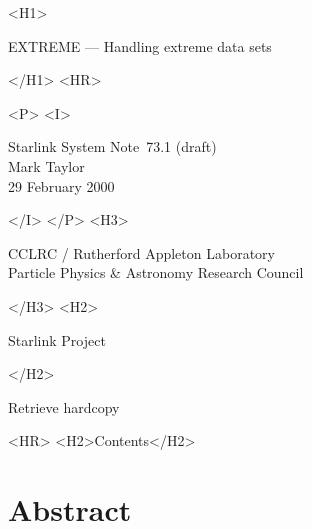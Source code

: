 \documentclass[twoside,11pt]{article}
\newcommand{\stardoccategory}  {Starlink System Note}
\newcommand{\stardocsource}    {ssn\stardocnumber}
\newcommand{\stardocnumber}    {73.1 (draft)}
\newcommand{\stardocauthors}   {Mark Taylor}
\newcommand{\stardocdate}      {29 February 2000}
\newcommand{\stardoctitle}     {EXTREME --- Handling extreme data sets}
\newcommand{\htmladdnormallink}[2]{#1}
\newcommand{\htmladdimg}[1]{}
\newcommand{\htmlref}[2]{#1}
\newcommand{\htmladdtonavigation}[1]{}
\newcommand{\xlabel}[1]{}
\renewcommand{\_}{\texttt{\symbol{95}}}
\begin{document}
\begin{htmlonly}
   \xlabel{}
   \begin{rawhtml} <H1> \end{rawhtml}
      \stardoctitle
   \begin{rawhtml} </H1> <HR> \end{rawhtml}

   \begin{rawhtml} <P> <I> \end{rawhtml}
   \stardoccategory\ \stardocnumber \\
   \stardocauthors \\
   \stardocdate
   \begin{rawhtml} </I> </P> <H3> \end{rawhtml}
      \htmladdnormallink{CCLRC / Rutherford Appleton Laboratory}
                        {http://www.cclrc.ac.uk} \\
      \htmladdnormallink{Particle Physics \& Astronomy Research Council}
                        {http://www.pparc.ac.uk} \\
   \begin{rawhtml} </H3> <H2> \end{rawhtml}
      \htmladdnormallink{Starlink Project}{http://www.starlink.rl.ac.uk/}
   \begin{rawhtml} </H2> \end{rawhtml}
   \htmladdnormallink{\htmladdimg{source.gif} Retrieve hardcopy}
      {http://www.starlink.rl.ac.uk/cgi-bin/hcserver?\stardocsource}\\

  \label{stardoccontents}
  \begin{rawhtml} 
    <HR>
    <H2>Contents</H2>
  \end{rawhtml}
  \htmladdtonavigation{\htmlref{\htmladdimg{contents_motif.gif}}
        {stardoccontents}}

  \section{\xlabel{abstract}Abstract}

\end{htmlonly}
\end{document}
